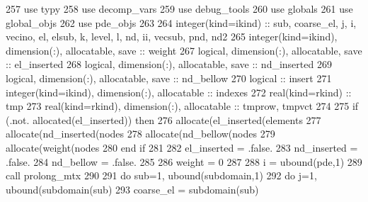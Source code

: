 \begin{DoxyCode}
257       \textcolor{keywordtype}{use }typy
258       \textcolor{keywordtype}{use }decomp_vars
259       \textcolor{keywordtype}{use }debug_tools
260       \textcolor{keywordtype}{use }globals
261       \textcolor{keywordtype}{use }global_objs
262       \textcolor{keywordtype}{use }pde_objs
263       
264       \textcolor{keywordtype}{integer(kind=ikind)} :: sub, coarse\_el, j, i, vecino, el, elsub, k,\textcolor{comment}{ level, l, nd, ii, vecsub, pnd, nd2}
265 \textcolor{comment}{      }\textcolor{keywordtype}{integer(kind=ikind)}, \textcolor{keywordtype}{dimension(:)}, \textcolor{keywordtype}{allocatable}, \textcolor{keywordtype}{save} :: weight
267       \textcolor{keywordtype}{logical}, \textcolor{keywordtype}{dimension(:)}, \textcolor{keywordtype}{allocatable}, \textcolor{keywordtype}{save} :: el\_inserted
268       \textcolor{keywordtype}{logical}, \textcolor{keywordtype}{dimension(:)}, \textcolor{keywordtype}{allocatable}, \textcolor{keywordtype}{save} :: nd\_inserted
269       \textcolor{keywordtype}{logical}, \textcolor{keywordtype}{dimension(:)}, \textcolor{keywordtype}{allocatable}, \textcolor{keywordtype}{save} :: nd\_bellow
270       \textcolor{keywordtype}{logical} :: insert
271       \textcolor{keywordtype}{integer(kind=ikind)}, \textcolor{keywordtype}{dimension(:)}, \textcolor{keywordtype}{allocatable} :: indexes
272       \textcolor{keywordtype}{real(kind=rkind)} :: tmp
273       \textcolor{keywordtype}{real(kind=rkind)}, \textcolor{keywordtype}{dimension(:)}, \textcolor{keywordtype}{allocatable} :: tmprow, tmpvct
274       
275       \textcolor{keywordflow}{if} (.not. \textcolor{keyword}{allocated}(el\_inserted)) \textcolor{keywordflow}{then}
276         \textcolor{keyword}{allocate}(el\_inserted(elements%
277         \textcolor{keyword}{allocate}(nd\_inserted(nodes%
278         \textcolor{keyword}{allocate}(nd\_bellow(nodes%
279         \textcolor{keyword}{allocate}(weight(nodes%
280 \textcolor{keywordflow}{      end if}
281       
282       el\_inserted = .false.
283       nd\_inserted = .false.
284       nd\_bellow = .false.
285       
286       weight = 0
287       
288       i = ubound(pde,1)
289       \textcolor{keyword}{call }prolong_mtx%
290 \textcolor{comment}{            }
291 \textcolor{comment}{      }\textcolor{keywordflow}{do} sub=1, ubound(subdomain,1)
292         \textcolor{keywordflow}{do} j=1, ubound(subdomain(sub)%
293           coarse\_el = subdomain(sub)%

\end{DoxyCode}
